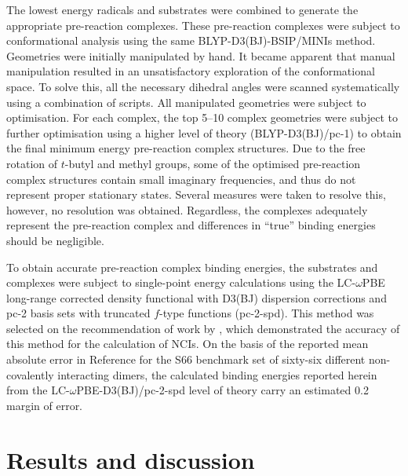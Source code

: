 The lowest energy radicals and substrates were combined to generate the appropriate pre-reaction complexes. These pre-reaction complexes were subject to conformational analysis using the same BLYP-D3(BJ)-BSIP/MINIs method. Geometries were initially manipulated by hand. It became apparent that manual manipulation resulted in an unsatisfactory exploration of the conformational space. To solve this, all the necessary dihedral angles were scanned systematically using a combination of scripts.\cite{note5} All manipulated geometries were subject to optimisation. For each complex, the top 5--10 complex geometries were subject to further optimisation using a higher level of theory (BLYP-D3(BJ)/pc-1) to obtain the final minimum energy pre-reaction complex structures. Due to the free rotation of $t$-butyl and methyl groups, some of the optimised pre-reaction complex structures contain small imaginary frequencies, and thus do not represent proper stationary states. Several measures were taken to resolve this, however, no resolution was obtained. Regardless, the complexes adequately represent the pre-reaction complex and differences in ``true'' binding energies should be negligible.

To obtain accurate pre-reaction complex binding energies, the substrates and complexes were subject to single-point energy calculations using the LC-$\omega$PBE long-range corrected density functional\cite{Vydrov2006,Vydrov2006a} with D3(BJ) dispersion corrections and pc-2 basis sets with truncated $f$-type functions (pc-2-spd).\cite{Johnson2013} This method was selected on the recommendation of work by \citet{Johnson2013}, which demonstrated the accuracy of this method for the calculation of NCIs. On the basis of the reported mean absolute error in Reference  for the S66 benchmark set of sixty-six different non-covalently interacting dimers,\cite{Rezac2011} the calculated binding energies reported herein from the LC-$\omega$PBE-D3(BJ)/pc-2-spd level of theory carry an estimated 0.2 \kcalmol margin of error.

\section{Results and discussion}

